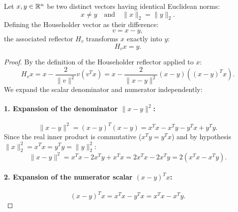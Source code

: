 \begin{lemma}
\label{lem:fundamental-reflection-en}
Let $x, y \in \mathbb{R}^n$ be two distinct vectors having identical Euclidean norms:
\begin{equation}
    x \neq y \quad \text{and} \quad \|x\|_2 = \|y\|_2.
\end{equation}
Defining the Householder vector as their difference:
\begin{equation}
    v = x - y,
\end{equation}
the associated reflector $H_v$ transforms $x$ exactly into $y$:
\begin{equation}
    H_v x = y.
\end{equation}
\end{lemma}

\begin{proof}
By the definition of the Householder reflector applied to $x$:
\begin{equation}
    H_v x = x - \frac{2}{\|v\|^2} v (v^T x) = x - \frac{2}{\|x - y\|^2} (x - y) \left( (x - y)^T x \right).
    \label{eq:proof-lemma-base-en}
\end{equation}
We expand the scalar denominator and numerator independently:

\paragraph{1. Expansion of the denominator $\|x - y\|^2$:}
\begin{equation}
    \|x - y\|^2 = (x - y)^T (x - y) = x^T x - x^T y - y^T x + y^T y.
\end{equation}
Since the real inner product is commutative ($x^T y = y^T x$) and by hypothesis $\|x\|_2^2 = x^T x = y^T y = \|y\|_2^2$:
\begin{equation}
    \|x - y\|^2 = x^T x - 2 x^T y + x^T x = 2 x^T x - 2 x^T y = 2 (x^T x - x^T y).
    \label{eq:proof-denom-en}
\end{equation}

\paragraph{2. Expansion of the numerator scalar $(x - y)^T x$:}
\begin{equation}
    (x - y)^T x = x^T x - y^T x = x^T x - x^T y.
    \label{eq:proof-num-en}
\end{equation}


\end{proof}
